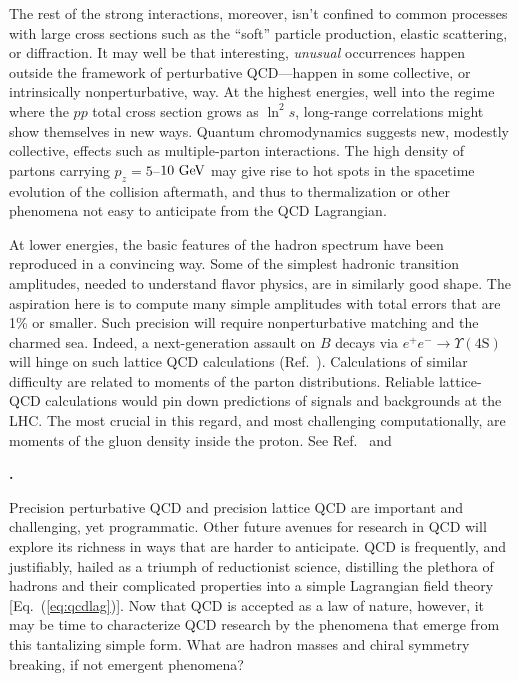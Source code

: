 \documentclass[11pt,prb,groupedaddress,nofootinbib,showpacs,floatfix]{revtex4-1}
\newcommand{\gev}{\hbox{ GeV}}
\newcommand{\Eqn}[1]{Eq.~(\ref{#1})}
\newcommand{\citentry}[1]{%
\par\addvspace{0.5em plus 0.05em minus 0.05em}%
\sloppy
\noindent\textbf{\onlinecite{#1}.}~\bibentry{#1}%
\par\addvspace{0.5em plus 0.05em minus 0.05em}
}
\begin{document}
The rest of the strong interactions, moreover, isn't confined to common  
processes with large cross sections such as the ``soft'' particle 
production, elastic scattering, or diffraction.
It may well be that interesting, \textit{unusual} occurrences happen 
outside the framework of perturbative QCD---happen in some collective, 
or intrinsically nonperturbative, way.
At the highest energies, well into the regime where the $pp$ total 
cross section grows as $\ln^2s$, long-range correlations might show 
themselves in new ways.
Quantum chromodynamics suggests new, modestly collective, effects such 
as multiple-parton interactions.
The high density of partons carrying $p_z=5$--$10\gev$ may give rise to 
hot spots in the spacetime evolution of the collision aftermath, and 
thus to thermalization or other phenomena not easy to anticipate from 
the QCD Lagrangian.

At lower energies, the basic features of the hadron spectrum have been 
reproduced in a convincing way.
Some of the simplest hadronic transition amplitudes, needed to understand 
flavor physics, are in similarly good shape.
The aspiration here is to compute many simple amplitudes with total errors 
that are 1\% or smaller.
Such precision will require nonperturbative matching and the charmed 
sea.
Indeed, a next-generation assault on $B$ decays via 
$e^+e^-\to\Upsilon(\mathrm{4S})$ will hinge on such lattice QCD 
calculations (Ref.~).
Calculations of similar difficulty are related to moments of the parton 
distributions.
Reliable lattice-QCD calculations would pin down predictions of signals 
and backgrounds at the LHC.
The most crucial in this regard, and most challenging computationally, 
are moments of the gluon density inside the proton.
See Ref.~ and
\citentry{Renner:2010ks}

Precision perturbative QCD and precision lattice QCD are important and 
challenging, yet programmatic.
Other future avenues for research in QCD will explore its richness in 
ways that are harder to anticipate.
QCD is frequently, and justifiably, hailed as a triumph of reductionist 
science, distilling the plethora of hadrons and their complicated 
properties into a simple Lagrangian field theory [\Eqn{eq:qcdlag}].
Now that QCD is accepted as a law of nature, however, it may be time to 
characterize QCD research by the phenomena that emerge from 
this tantalizing simple form.
What are hadron masses and chiral symmetry breaking, if not emergent 
phenomena?
\end{document}
